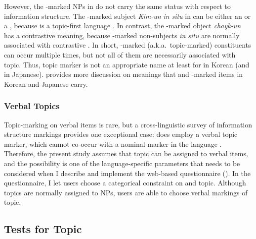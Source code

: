 
\noindent However, the \nun-marked NPs in
 do not carry the same status with
respect to information structure. The \nun-marked subject
\textit{Kim-un} \textit{in situ} in 
can be either an  or a , because
 is a topic-first language \citep{sohn:01}. In contrast,
the \nun-marked object \textit{chayk-un} has a contrastive meaning,
because \nun-marked non-subjects \textit{in situ} are normally
associated with contrastive  \citep{choi:99,song:bender:11}. In
short, \nun-marked (a.k.a.\ topic-marked) constituents can occur
multiple times, but not all of them are necessarily associated with
topic.  Thus, topic marker is not an appropriate name at least for
\nun in Korean (and \wa in Japanese).   provides more
discussion on meanings that \nun and \wa-marked items in Korean and
Japanese carry.





\subsubsection{Verbal Topics}
\label{3:sssec:verbal-topics}


Topic-marking on verbal items is rare, but a cross-linguistic survey
of information structure markings provides one exceptional case:
 does employ a verbal topic marker, which cannot
co-occur with a nominal  marker in the language
\citep{chapman:81}. Therefore, the present study assumes that topic
can be assigned to verbal items, and the possibility is one of the
language-specific parameters that needs to be considered when I
describe and implement the web-based questionnaire
(). In the questionnaire, I let users choose
a categorical constraint on  and topic. Although topics are
normally assigned to NPs, users are able to choose verbal markings of
topic.




\subsection{Tests for Topic}
\label{3:ssec:tests-topic}


